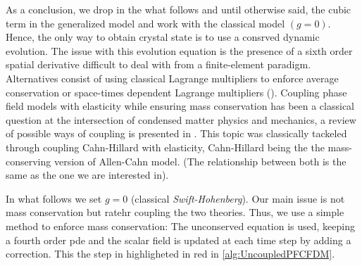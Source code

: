 \documentclass{article}
\begin{document}
As a conclusion, we drop in the what follows and until otherwise said, the cubic term in the generalized model and work with the classical model $(g=0)$. Hence, the only way to obtain crystal state is to use a consrved dynamic evolution. The issue with this evolution equation is the presence of a sixth order spatial derivative difficult to deal with from a finite-element paradigm. Alternatives consist of using classical Lagrange multipliers to enforce average conservation or space-times dependent Lagrange multipliers (\cite{leeNewConservativeSwift2020}). Coupling phase field models with elasticity while ensuring mass conservation has been a classical question at the intersection of condensed matter physics and mechanics, a review of possible ways of coupling is presented in \cite{bartelsCahnHilliardPhase2021} . This topic was classically tackeled through coupling Cahn-Hillard with elasticity, Cahn-Hillard being the the mass-conserving version of Allen-Cahn model. (The relationship between both is the same as the one we are interested in). 
\begin{mybox}
In what follows we set $g=0$ (classical \emph{Swift-Hohenberg}). Our main issue is not mass conservation but ratehr coupling the two theories. Thus, we use a simple method to enforce mass conservation: The unconserved equation is used, keeping a fourth order pde and the scalar field is updated at each time step by adding a correction. This the step in highligheted in red in \cref{alg:UncoupledPFCFDM}.
\end{mybox}
\end{document}
